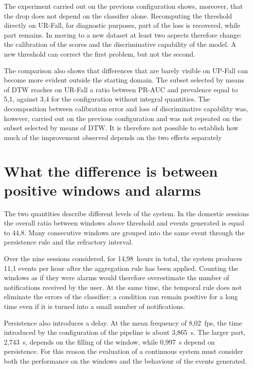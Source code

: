 The experiment carried out on the previous configuration shows, moreover, that the drop does not depend on the classifier alone. Recomputing the threshold directly on UR-Fall, for diagnostic purposes, part of the loss is recovered, while part remains. In moving to a new dataset at least two aspects therefore change: the calibration of the scores and the discriminative capability of the model. A new threshold can correct the first problem, but not the second.

The comparison also shows that differences that are barely visible on UP-Fall can become more evident outside the starting domain. The subset selected by means of DTW reaches on UR-Fall a ratio between PR-AUC and prevalence equal to 5,1, against 3,4 for the configuration without integral quantities. The decomposition between calibration error and loss of discriminative capability was, however, carried out on the previous configuration and was not repeated on the subset selected by means of DTW. It is therefore not possible to establish how much of the improvement observed depends on the two effects separately

\section{What the difference is between positive windows and alarms}

The two quantities describe different levels of the system.
In the domestic sessions the overall ratio between windows above threshold and events generated is equal to 44,8. Many consecutive windows are grouped into the same event through the persistence rule and the refractory interval.

Over the nine sessions considered, for 14,98~hours in total, the system produces 11,1 events per hour after the aggregation rule has been applied. Counting the windows as if they were alarms would therefore overestimate the number of notifications received by the user. At the same time, the temporal rule does not eliminate the errors of the classifier: a condition can remain positive for a long time even if it is turned into a small number of notifications.

Persistence also introduces a delay. At the mean frequency of 8,02~fps, the time introduced by the configuration of the pipeline is about 3,865~s. The larger part, 2,743~s, depends on the filling of the window, while 0,997~s depend on persistence. For this reason the evaluation of a continuous system must consider both the performance on the windows and the behaviour of the events generated.

